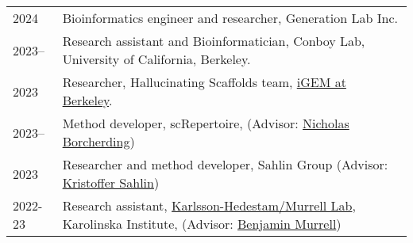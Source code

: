 
\begin{longtable}[l]{@{}p{} p{}}


    2024 & Bioinformatics engineer and researcher, Generation Lab Inc. \\

    2023-- & Research assistant and Bioinformatician, Conboy Lab, University of California, Berkeley.\\

    2023 & Researcher, Hallucinating Scaffolds team, \href{https://igem.studentorg.berkeley.edu/teams/hallucinating-scaffolds/}{iGEM at Berkeley}. \\

    2023-- & Method developer, scRepertoire, (Advisor: \href{https://www.borch.dev/}{Nicholas Borcherding})\\

    2023 & Researcher and method developer, Sahlin Group (Advisor: \href{https://www.scilifelab.se/researchers/kristoffer-sahlin/}{Kristoffer Sahlin}) \\

    2022-23 & Research assistant, \href{https://ki.se/en/people/benjamin-murrell}{Karlsson-Hedestam/Murrell Lab}, Karolinska Institute, (Advisor: \href{https://ki.se/en/people/benjamin-murrell}{Benjamin Murrell}) \\

\end{longtable}
